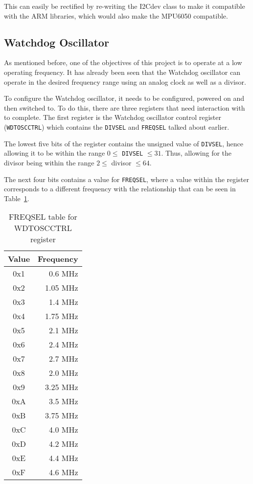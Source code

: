 This can easily be rectified by re-writing the I2Cdev class to make it compatible with the ARM libraries, which would also make the MPU6050 compatible.


\subsection{Watchdog Oscillator}

As mentioned before, one of the objectives of this project is to operate at a low operating frequency. It has already been seen that the Watchdog oscillator can operate in the desired frequency range using an analog clock as well as a divisor. 

To configure the Watchdog oscillator, it needs to be configured, powered on and then switched to. To do this, there are three registers that need interaction with to complete. The first register is the Watchdog oscillator control register (\verb|WDTOSCCTRL|) which contains the \verb|DIVSEL| and \verb|FREQSEL| talked about earlier. 

The lowest five bits of the register contains the unsigned value of \verb|DIVSEL|, hence allowing it to be within the range $ 0 \leq $ \verb|DIVSEL| $ \leq 31$. Thus, allowing for the divisor being within the range $ 2 \leq $ divisor $ \leq 64$.

The next four bits contains a value for \verb|FREQSEL|, where a value within the register corresponds to a different frequency with the relationship that can be seen in Table~\ref{tab:freqsel}.

\begin{table}
	\centering
	\begin{tabular}{|c|r|}
		\hline
		Value & Frequency \\
		\hline
		0x1 & 0.6 MHz \\
		0x2 & 1.05 MHz \\
		0x3 & 1.4 MHz \\
		0x4 & 1.75 MHz \\
		0x5 & 2.1 MHz \\
		0x6 & 2.4 MHz \\
		0x7 & 2.7 MHz \\
		0x8 & 2.0 MHz \\
		0x9 & 3.25 MHz \\
		0xA & 3.5 MHz \\
		0xB & 3.75 MHz \\
		0xC & 4.0 MHz \\
		0xD & 4.2 MHz \\
		0xE & 4.4 MHz \\
		0xF & 4.6 MHz \\
		\hline
	\end{tabular}
	\caption{FREQSEL table for WDTOSCCTRL register}
	\label{tab:freqsel}
\end{table}

